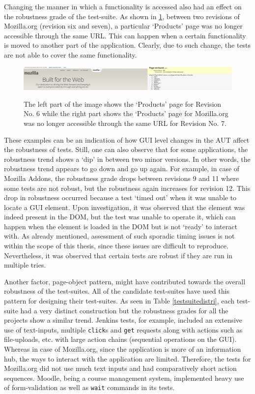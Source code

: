 Changing the manner in which a functionality is accessed also had an effect on the robustness grade of the test-suite. As shown in \ref{fig:bedrockchanges}, between two revisions of Mozilla.org (revision six and seven), a particular `Products' page was no longer accessible through the same URL. This can happen when a certain functionality is moved to another part of the application. Clearly, due to such change, the tests are not able to cover the same functionality. 

\begin{figure}[ht!] 
\centering     %
{\label{rob:bedrock1}\includegraphics[width=\linewidth]{./Figures/bedrock1}}
\captionsetup{justification=justified,
singlelinecheck=false}
\caption{ The left part of the image shows the `Products' page for Revision No. 6 while the right part shows the `Products' page for Mozilla.org was no longer accessible through the same URL for Revision No. 7.}
\label{fig:bedrockchanges}
\end{figure} 

These examples can be an indication of how GUI level changes in the AUT affect the robustness of tests. Still, one can also observe that for some applications, the robustness trend shows a `dip' in between two minor versions. In other words, the robustness trend appears to go down and go up again. For example, in case of Mozilla Addons, the robustness grade drops between revisions 9 and 11 where some tests are not robust, but the robustness again increases for revision 12. This drop in robustness occurred because a test `timed out' when it was unable to locate a GUI element. Upon investigation, it was observed that the element was indeed present in the DOM, but the test was unable to operate it, which can happen when the element is loaded in the DOM but is not `ready' to interact with. As already mentioned, assessment of such sporadic timing issues is not within the scope of this thesis, since these issues are difficult to reproduce. Nevertheless, it was observed that certain tests are robust if they are run in multiple tries. 


Another factor, page-object pattern, might have contributed towards the overall robustness of the test-suites. All of the candidate test-suites have used this pattern for designing their test-suites. As seen in Table \ref{testsuitedistri}, each test-suite had a very distinct construction but the robustness grades for all the projects show a similar trend. Jenkins tests, for example, included an extensive use of text-inputs, multiple \texttt{click}s and \texttt{get} requests along with actions such as file-uploads, etc. with large action chains (sequential operations on the GUI). Whereas in case of Mozilla.org, since the application is more of an information hub, the ways to interact with the application are limited. Therefore, the tests for Mozilla.org did not use much text inputs and had comparatively short action sequences. Moodle, being a course management system, implemented heavy use of form-validation as well as \texttt{wait} commands in its tests. 

